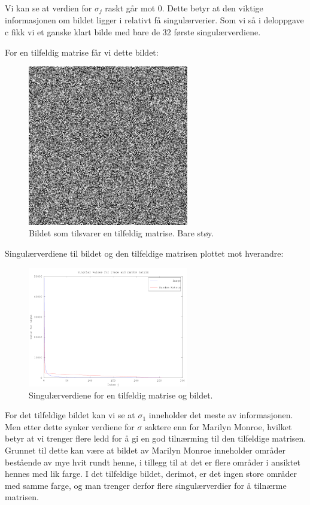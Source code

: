 \documentclass[a4paper,norsk, 10pt]{article}
\begin{document}
Vi kan se at verdien for $\sigma_j$ raskt går mot 0. Dette betyr at den viktige informasjonen om bildet ligger i relativt få singulærverier. Som vi så i deloppgave c fikk vi et ganske klart bilde med bare de 32 første singulærverdiene.\\

\newpage

For en tilfeldig matrise får vi dette bildet:

\begin{figure}[H]
\begin{center}
\includegraphics[width = 70mm]{randomPic.png}
\caption{Bildet som tilsvarer en tilfeldig matrise. Bare støy.}
\end{center}
\end{figure}

Singulærverdiene til bildet og den tilfeldige matrisen plottet mot hverandre:

\begin{figure}[H]
\begin{center}
\includegraphics[width = 70mm]{randomAndImage.png}
\caption{Singulærverdiene for en tilfeldig matrise og bildet.}
\end{center}
\end{figure}

For det tilfeldige bildet kan vi se at $\sigma_1$ inneholder det meste av informasjonen. Men etter dette synker verdiene for $\sigma$ saktere enn for Marilyn Monroe, hvilket betyr at vi trenger flere ledd for å gi en god tilnærming til den tilfeldige matrisen. Grunnet til dette kan være at bildet av Marilyn Monroe inneholder områder bestående av mye hvit rundt henne, i tillegg til at det er flere områder i ansiktet hennes med lik farge. I det tilfeldige bildet, derimot, er det ingen store områder med samme farge, og man trenger derfor flere singulærverdier for å tilnærme matrisen. 
\end{document}
